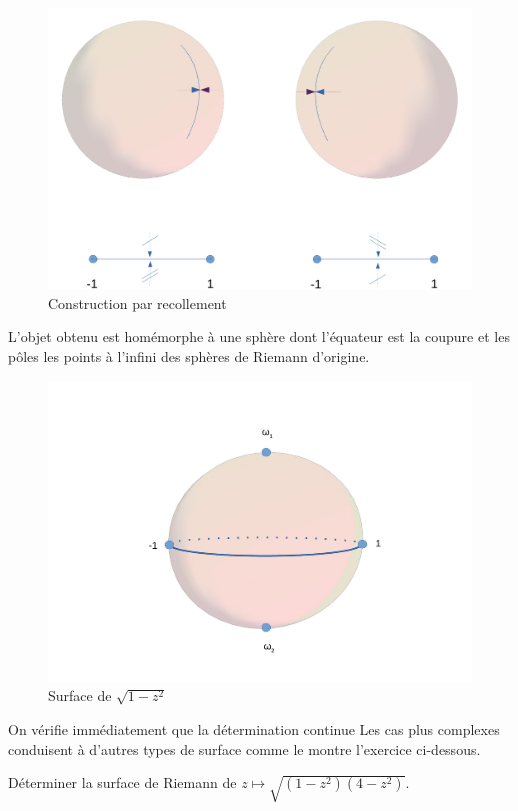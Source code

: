 \begin{figure}[ht]
    \centering
    \includegraphics[scale=0.6]{images/recollement_spheres.pdf}
    \caption{Construction par recollement}
    \label{fig:gluing_spheres}
\end{figure}
L'objet obtenu est homémorphe à une sphère dont l'équateur est la coupure et les pôles les points à l'infini des sphères de Riemann d'origine. 
\begin{figure}[h!]
    \centering
    \includegraphics[scale=0.4]{images/surface_racine.pdf}
    \caption{Surface de $\sqrt{1-z^2}$}
    \label{fig:surface_racine_carre}
\end{figure}
On vérifie immédiatement que la détermination continue 
Les cas plus complexes conduisent à d'autres types de surface comme le montre l'exercice ci-dessous.
\begin{exercice}
Déterminer la surface de Riemann de $z \mapsto \sqrt{(1-z^2)(4-z^2)}$.
\end{exercice}
